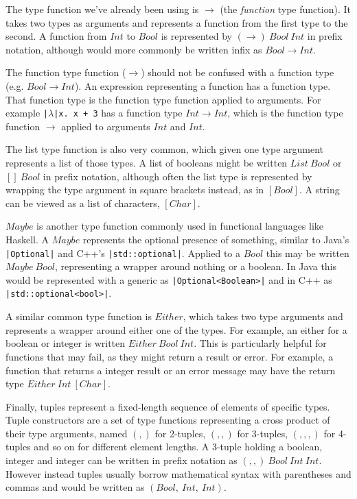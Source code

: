 \documentclass[a4paper,fleqn,oneside,12pt]{report}
\begin{document}
The type function we've already been using is $\rightarrow$ (the \textit{function} type function). It takes two types as arguments and represents a function from the first type to the second. A function from $Int$ to $Bool$ is represented by $(\rightarrow)\ Bool\ Int$ in prefix notation, although would more commonly be written infix as $Bool \rightarrow Int$.

The function type function ($\rightarrow$) should not be confused with a function type (e.g. $Bool \rightarrow Int$). An expression representing a function has a function type. That function type is the function type function applied to arguments. For example \texttt{|$\lambda$|x. x + 3} has a function type $Int \rightarrow Int$, which is the function type function $\rightarrow$ applied to arguments $Int$ and $Int$.

The list type function is also very common, which given one type argument represents a list of those types. A list of booleans might be written $List\ Bool$ or $[]\ Bool$ in prefix notation, although often the list type is represented by wrapping the type argument in square brackets instead, as in $[Bool]$. A string can be viewed as a list of characters, $[Char]$.

$Maybe$ is another type function commonly used in functional languages like Haskell. A $Maybe$ represents the optional presence of something, similar to Java’s \texttt{|Optional|} and C++’s \texttt{|std::optional|}. Applied to a $Bool$ this may be written $Maybe\ Bool$, representing a wrapper around nothing or a boolean. In Java this would be represented with a generic as \texttt{|Optional<Boolean>|} and in C++ as \texttt{|std::optional<bool>|}.

A similar common type function is $Either$, which takes two type arguments and represents a wrapper around either one of the types. For example, an either for a boolean or integer is written $Either\ Bool\ Int$. This is particularly helpful for functions that may fail, as they might return a result or error. For example, a function that returns a integer result or an error message may have the return type $Either\ Int\ [Char]$.

Finally, tuples represent a fixed-length sequence of elements of specific types. Tuple constructors are a set of type functions representing a cross product of their type arguments, named $(,)$ for 2-tuples, $(,,)$ for 3-tuples, $(,,,)$ for 4-tuples and so on for different element lengths. A 3-tuple holding a boolean, integer and integer can be written in prefix notation as $(,,)\ Bool\ Int\ Int$. However instead tuples usually borrow mathematical syntax with parentheses and commas and would be written as $(Bool,\ Int,\ Int)$.
\end{document}
